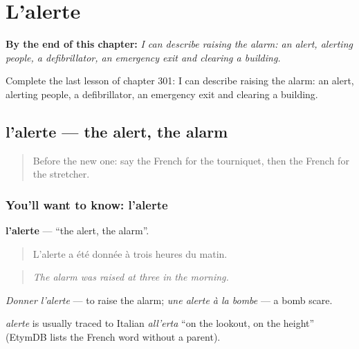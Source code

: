 
\chapter{L'alerte}
\label{ch:fr-l-alerte}

\begin{chapteropening}
\textbf{By the end of this chapter:} \emph{I can describe raising the alarm: an alert, alerting people, a defibrillator, an emergency exit and clearing a building.}

Complete the last lesson of chapter 301: I can describe raising the alarm: an alert, alerting people, a defibrillator, an emergency exit and clearing a building.
\end{chapteropening}

\section[l'alerte]{l'alerte — the alert, the alarm}

\label{lesson:FR-C301-alerte}



\begin{quote}
Before the new one: say the French for the tourniquet, then the French for the stretcher.
\end{quote}

\subsection*{You'll want to know: l'alerte}
\textbf{l'alerte} — \textquotedblleft{}the alert, the alarm\textquotedblright{}.

\begin{quote}
L'alerte a été donnée à trois heures du matin.
\end{quote}

\begin{quote}
\emph{The alarm was raised at three in the morning.}
\end{quote}

\emph{Donner l'alerte} — to raise the alarm; \emph{une alerte à la bombe} — a bomb scare.

\begin{cousinweb}
\emph{alerte} is usually traced to Italian \emph{all'erta} \textquotedblleft{}on the lookout, on the height\textquotedblright{} (EtymDB lists the French word without a parent).
\end{cousinweb}


